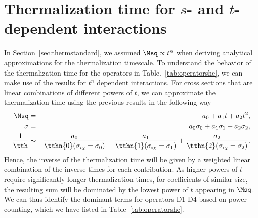 \section{Thermalization time for $s$- and $t$-dependent interactions}
\label{sec:sdeptherm}


In Section~\ref{sec:thermstandard}, we assumed $\Msq\propto t^n$ when deriving analytical approximations for the thermalization timescale. To understand the behavior of the thermalization time for the operators in Table.~\ref{tab:operatorshe}, we can make use of the results for $t^n$ dependent interactions. For cross sections that are linear combinations of different powers of $t$, we can approximate the thermalization time using the previous results in the following way
\begin{eqnarray}
\Msq &=& a_0 + a_1 t + a_2 t^2,\\
\sigma &=& a_0\sigma_0 + a_1 \sigma_1 + a_2 \sigma_2,\\
\frac{1}{\tth} &\sim& \frac{a_0}{ \tthn{0}(\sigma_{i\chi}=\sigma_0)} + \frac{a_1} {\tthn{1}(\sigma_{i\chi}=\sigma_1)} 
 + \frac{a_2}{  \tthn{2}(\sigma_{i\chi}=\sigma_2)}. 
\label{eq:ttherm_weighted}
\end{eqnarray}
Hence, the inverse of the thermalization time will be given by a weighted linear combination of the inverse times for each contribution. As higher powers of $t$ require significantly longer thermalization times, for coefficients of similar size, the resulting sum will be dominated by the lowest power of $t$ appearing in  $\Msq$.  We can thus identify the dominant terms for operators D1-D4  based on power counting, which we have listed in Table~\ref{tab:operatorshe}.

